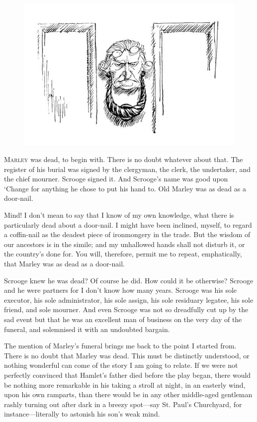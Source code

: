 \documentclass[paper=a5,BCOR=15mm,twoside,DIV=15,headinclude=off,12pt,chapterprefix=off,openany,headings=huge]{scrbook} %
\begin{document}
\renewcommand*{\chaptermarkformat}{}
\begin{figure}[h]
\centering
\includegraphics[width=0.8\linewidth]{gs016}
\end{figure}
\lettrine[loversize=.85]{M}{arley} was dead, to begin with. There is no doubt whatever about that. The register of his burial was signed by the clergyman, the clerk, the undertaker, and the chief mourner. Scrooge signed it. And Scrooge's name was good upon `Change for anything he chose to put his hand to. Old Marley was as dead as a door-nail.

Mind! I don't mean to say that I know of my own knowledge, what there is particularly dead about a door-nail. I might have been inclined, myself, to regard a coffin-nail as the deadest piece of ironmongery in the trade. But the wisdom of our ancestors is in the simile; and my unhallowed hands shall not disturb it, or the country's done for. You will, therefore, permit me to repeat, emphatically, that Marley was as dead as a door-nail.

Scrooge knew he was dead? Of course he did. How could it be otherwise? Scrooge and he were partners for I don't know how many years. Scrooge was his sole executor, his sole administrator, his sole assign, his sole residuary legatee, his sole friend, and sole mourner. And even Scrooge was not so dreadfully cut up by the sad event but that he was an excellent man of business on the very day of the funeral, and solemnised it with an undoubted bargain.

The mention of Marley's funeral brings me back to the point I started from. There is no doubt that Marley was dead. This must be distinctly understood, or nothing wonderful can come of the story I am going to relate. If we were not perfectly convinced that Hamlet's father died before the play began, there would be nothing more remarkable in his taking a stroll at night, in an easterly wind, upon his own ramparts, than there would be in any other middle-aged gentleman rashly turning out after dark in a breezy spot—say St. Paul's Churchyard, for instance—literally to astonish his son's weak mind.
\end{document}
